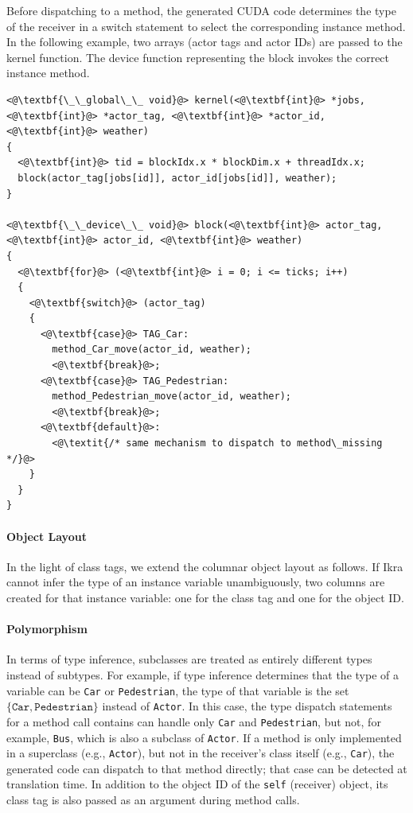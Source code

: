 \documentclass[preprint]{sigplanconf}
\begin{document}
Before dispatching to a method, the generated CUDA code determines the type of the receiver in a switch statement to select the corresponding instance method. In the following example, two arrays (actor tags and actor IDs) are passed to the kernel function. The device function representing the block invokes the correct instance method.

\lstset{language=C++}
\begin{lstlisting}
<@\textbf{\_\_global\_\_ void}@> kernel(<@\textbf{int}@> *jobs, <@\textbf{int}@> *actor_tag, <@\textbf{int}@> *actor_id, <@\textbf{int}@> weather)
{
  <@\textbf{int}@> tid = blockIdx.x * blockDim.x + threadIdx.x;
  block(actor_tag[jobs[id]], actor_id[jobs[id]], weather);
}

<@\textbf{\_\_device\_\_ void}@> block(<@\textbf{int}@> actor_tag, <@\textbf{int}@> actor_id, <@\textbf{int}@> weather)
{
  <@\textbf{for}@> (<@\textbf{int}@> i = 0; i <= ticks; i++)
  {
    <@\textbf{switch}@> (actor_tag)
    {
      <@\textbf{case}@> TAG_Car:
        method_Car_move(actor_id, weather);
        <@\textbf{break}@>;
      <@\textbf{case}@> TAG_Pedestrian:
        method_Pedestrian_move(actor_id, weather);
        <@\textbf{break}@>;
      <@\textbf{default}@>:
        <@\textit{/* same mechanism to dispatch to method\_missing */}@>
    }
  }
}
\end{lstlisting}

\paragraph{Object Layout}
In the light of class tags, we extend the columnar object layout as follows. If Ikra cannot infer the type of an instance variable unambiguously, two columns are created for that instance variable: one for the class tag and one for the object ID.

\paragraph{Polymorphism}
In terms of type inference, subclasses are treated as entirely different types instead of subtypes. For example, if type inference determines that the type of a variable can be \texttt{Car} or \texttt{Pedestrian}, the type of that variable is the set $\{\texttt{Car}, \texttt{Pedestrian}\}$ instead of \texttt{Actor}. In this case, the type dispatch statements for a method call contains can handle only \texttt{Car} and \texttt{Pedestrian}, but not, for example, \texttt{Bus}, which is also a subclass of \texttt{Actor}. If a method is only implemented in a superclass (e.g., \texttt{Actor}), but not in the receiver's class itself (e.g., \texttt{Car}), the generated code can dispatch to that method directly; that case can be detected at translation time. In addition to the object ID of the \texttt{self} (receiver) object, its class tag is also passed as an argument during method calls.
\end{document}
